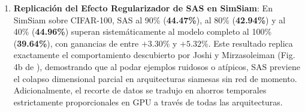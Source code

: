 \begin{enumerate}
    \item \textbf{Replicación del Efecto Regularizador de SAS en SimSiam}:
    En SimSiam sobre CIFAR-100, SAS al 90\% (\textbf{44.47\%}), al 80\% (\textbf{42.94\%}) y al 40\% (\textbf{44.96\%}) superan sistemáticamente al modelo completo al 100\% (\textbf{39.64\%}), con ganancias de entre $+3.30\%$ y $+5.32\%$. Este resultado replica exactamente el comportamiento descubierto por Joshi y Mirzasoleiman (Fig. 4b de \cite{joshi2023sas}), demostrando que al podar ejemplos ruidosos o atípicos, SAS previene el colapso dimensional parcial en arquitecturas siamesas sin red de momento. Adicionalmente, el recorte de datos se tradujo en ahorros temporales estrictamente proporcionales en GPU a través de todas las arquitecturas.
\end{enumerate}
